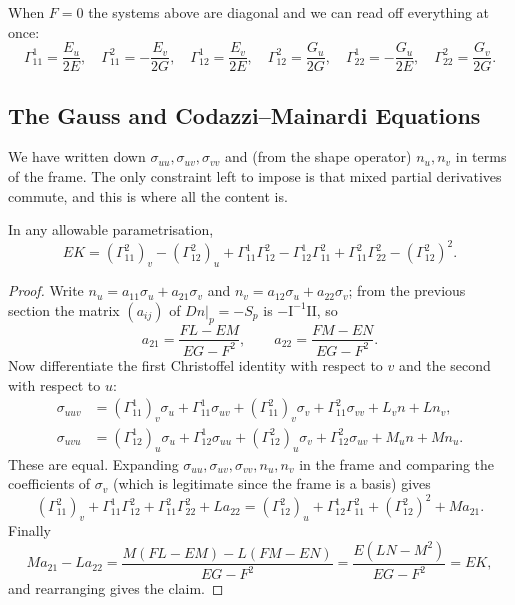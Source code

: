 \begin{example}
    When $F = 0$ the systems above are diagonal and we can read off everything at once:
    $$
    \Gamma^1_{11} = \frac{E_u}{2E}, \quad \Gamma^2_{11} = -\frac{E_v}{2G}, \quad \Gamma^1_{12} = \frac{E_v}{2E}, \quad \Gamma^2_{12} = \frac{G_u}{2G}, \quad \Gamma^1_{22} = -\frac{G_u}{2E}, \quad \Gamma^2_{22} = \frac{G_v}{2G}.
    $$
\end{example}

\subsection{The Gauss and Codazzi--Mainardi Equations}

We have written down $\sigma_{uu}, \sigma_{uv}, \sigma_{vv}$ and (from the shape operator) $n_u, n_v$ in terms of the frame. The only constraint left to impose is that mixed partial derivatives commute, and this is where all the content is.

\begin{theorem}
    In any allowable parametrisation,
    $$
    EK = \left(\Gamma^2_{11}\right)_v - \left(\Gamma^2_{12}\right)_u + \Gamma^1_{11}\Gamma^2_{12} - \Gamma^1_{12}\Gamma^2_{11} + \Gamma^2_{11}\Gamma^2_{22} - \left(\Gamma^2_{12}\right)^2.
    $$
\end{theorem}
\begin{proof}
    Write $n_u = a_{11}\sigma_u + a_{21}\sigma_v$ and $n_v = a_{12}\sigma_u + a_{22}\sigma_v$; from the previous section the matrix $(a_{ij})$ of $\left.Dn\right|_p = -S_p$ is $-\mathrm{I}^{-1}\mathrm{II}$, so
    $$
    a_{21} = \frac{FL - EM}{EG-F^2}, \qquad a_{22} = \frac{FM - EN}{EG-F^2}.
    $$
    Now differentiate the first Christoffel identity with respect to $v$ and the second with respect to $u$:
    \begin{align*}
        \sigma_{uuv} &= \left(\Gamma^1_{11}\right)_v \sigma_u + \Gamma^1_{11}\sigma_{uv} + \left(\Gamma^2_{11}\right)_v\sigma_v + \Gamma^2_{11}\sigma_{vv} + L_v n + L n_v, \\
        \sigma_{uvu} &= \left(\Gamma^1_{12}\right)_u \sigma_u + \Gamma^1_{12}\sigma_{uu} + \left(\Gamma^2_{12}\right)_u\sigma_v + \Gamma^2_{12}\sigma_{uv} + M_u n + M n_u.
    \end{align*}
    These are equal. Expanding $\sigma_{uu}, \sigma_{uv}, \sigma_{vv}, n_u, n_v$ in the frame and comparing the coefficients of $\sigma_v$ (which is legitimate since the frame is a basis) gives
    $$
    \left(\Gamma^2_{11}\right)_v + \Gamma^1_{11}\Gamma^2_{12} + \Gamma^2_{11}\Gamma^2_{22} + La_{22} = \left(\Gamma^2_{12}\right)_u + \Gamma^1_{12}\Gamma^2_{11} + \left(\Gamma^2_{12}\right)^2 + Ma_{21}.
    $$
    Finally
    $$
    Ma_{21} - La_{22} = \frac{M(FL-EM) - L(FM-EN)}{EG-F^2} = \frac{E(LN-M^2)}{EG-F^2} = EK,
    $$
    and rearranging gives the claim.
\end{proof}

